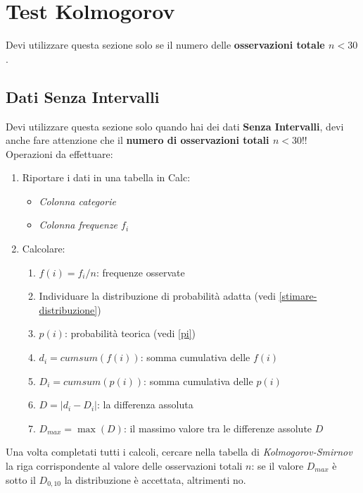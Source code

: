 \section{Test Kolmogorov}

Devi utilizzare questa sezione solo se il numero delle \textbf{osservazioni
      totale $n < 30$}.

\subsection{Dati Senza Intervalli}

Devi utilizzare questa sezione solo quando hai dei dati \textbf{Senza
      Intervalli}, devi anche fare attenzione che il \textbf{numero di
      osservazioni totali $n < 30$}!!\\

Operazioni da effettuare:

\begin{enumerate}
      \item Riportare i dati in una tabella in Calc:
            \begin{itemize}
                  \item \textit{Colonna categorie}
                  \item \textit{Colonna frequenze $f_i$}
            \end{itemize}
      \item Calcolare:
            \begin{enumerate}
                  \item $f(i) = f_i / n$: frequenze osservate
                  \item Individuare la distribuzione di probabilità adatta (vedi
                        \ref{stimare-distribuzione})
                  \item $p(i)$: probabilità teorica (vedi \ref{pi})
                  \item $d_i = cumsum(f(i))$: somma cumulativa delle $f(i)$
                  \item $D_i = cumsum(p(i))$: somma cumulativa delle $p(i)$
                  \item $D = |d_i - D_i|$: la differenza assoluta
                  \item $D_{max} = \max(D)$: il massimo valore tra le differenze
                        assolute $D$
            \end{enumerate}
\end{enumerate}

Una volta completati tutti i calcoli, cercare nella tabella di
\textit{Kolmogorov-Smirnov} la riga corrispondente al valore delle osservazioni
totali $n$: se il valore $D_{max}$ è sotto il $D_{0,10}$ la distribuzione è
accettata, altrimenti no.

